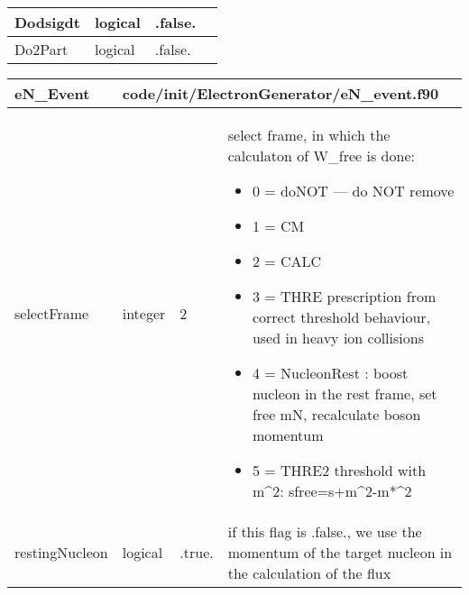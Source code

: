\documentclass{article}
\begin{document}
\begin{longtable}{llll}
\midrule
Dodsigdt & \begin{minipage}[t]{2cm}logical\end{minipage} & \begin{minipage}[t]{2cm}.false.\end{minipage} & \begin{minipage}[t]{12cm}\end{minipage}\\*
\midrule
Do2Part & \begin{minipage}[t]{2cm}logical\end{minipage} & \begin{minipage}[t]{2cm}.false.\end{minipage} & \begin{minipage}[t]{12cm}\end{minipage}\\*
\bottomrule
\end{longtable}
{ }




\begin{longtable}{llll}
\toprule
\textbf{\large{eN\_Event}} & \multicolumn{3}{l}{\footnotesize{code/init/ElectronGenerator/eN\_event.f90}}\\*
\midrule
\endfirsthead
\midrule
\endhead
selectFrame & \begin{minipage}[t]{2cm}integer\end{minipage} & \begin{minipage}[t]{2cm}2\end{minipage} & \begin{minipage}[t]{12cm}select frame, in which the calculaton of W\_free is done:\begin{itemize}\leftmargin0em\itemindent0pt\item 0 = doNOT   ---  do NOT remove\item 1 = CM\item 2 = CALC\item 3 = THRE  prescription from correct threshold behaviour, used in heavy ion collisions\item 4 = NucleonRest :  boost nucleon in the rest frame, set free mN, recalculate boson momentum\item 5 = THRE2 threshold with m\^{}2: sfree=s+m\^{}2-m*\^{}2\end{itemize}\end{minipage}\\*
\midrule
restingNucleon & \begin{minipage}[t]{2cm}logical\end{minipage} & \begin{minipage}[t]{2cm}.true.\end{minipage} & \begin{minipage}[t]{12cm}if this flag is .false., we use the momentum of the target nucleon in the calculation of the flux\end{minipage}\\*
\bottomrule
\end{longtable}
{ }
\end{document}
